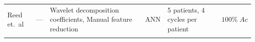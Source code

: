 \documentclass[titlepage, 12pt]{scrartcl} \usepackage{enumitem}
\newcommand{\dbottomrule}{\specialrule{1pt}{0pt}{1.4pt}%
            \specialrule{1pt}{0pt}{\belowrulesep}%
            }
\begin{document}
\begin{landscape}
\begin{table}[htbp]
\begin{tabulary}{\linewidth}{LLLLLL}
Reed et.\ al             & ---                                                                                                                                       & Wavelet decomposition coefficients, Manual feature reduction                                                    & ANN                   & 5 patients, 4 cycles per patient                                                                                        & $100\%\;Ac$                                        \\
\dbottomrule\\
\end{tabulary}
\end{table}
\end{landscape}
\restoregeometry
\end{document}

